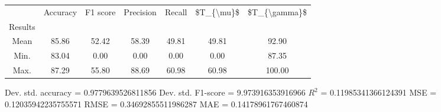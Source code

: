 \begin{tabular}{|c|c|c|c|c|c|c|}
\toprule
{} &  Accuracy &  F1 score &  Precision &  Recall &  \$T\_\{\textbackslash mu\}\$ &  \$T\_\{\textbackslash gamma\}\$ \\
Results &           &           &            &         &            &               \\
\hline
Mean    &     85.86 &     52.42 &      58.39 &   49.81 &      49.81 &         92.90 \\
Min.    &     83.04 &      0.00 &       0.00 &    0.00 &       0.00 &         87.35 \\
Max.    &     87.29 &     55.80 &      88.69 &   60.98 &      60.98 &        100.00 \\
\bottomrule
\end{tabular}

 Dev. std. accuracy = 0.9779639526811856
 Dev. std. F1-score = 9.973916353916966
 $R^2$ = 0.11985341366124391
 MSE = 0.12035942235755571
 RMSE = 0.34692855511986287
 MAE = 0.14178961767460874